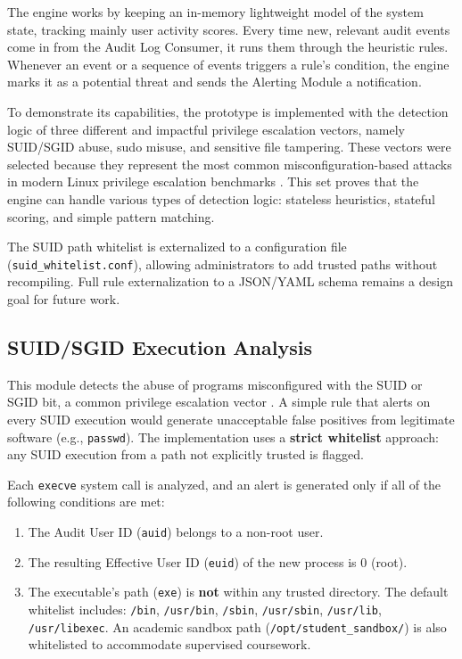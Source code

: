 \documentclass[journal]{./IEEEtran}
\begin{document}
The engine works by keeping an in-memory lightweight model of the system state, tracking mainly user activity scores. Every time new, relevant audit events come in from the Audit Log Consumer, it runs them through the heuristic rules. Whenever an event or a sequence of events triggers a rule's condition, the engine marks it as a potential threat and sends the Alerting Module a notification.

To demonstrate its capabilities, the prototype is implemented with the detection logic of three different and impactful privilege escalation vectors, namely SUID/SGID abuse, sudo misuse, and sensitive file tampering. These vectors were selected because they represent the most common misconfiguration-based attacks in modern Linux privilege escalation benchmarks \cite{happe2024}. This set proves that the engine can handle various types of detection logic: stateless heuristics, stateful scoring, and simple pattern matching.

The SUID path whitelist is externalized to a configuration file (\texttt{suid\_whitelist.conf}), allowing administrators to add trusted paths without recompiling. Full rule externalization to a JSON/YAML schema remains a design goal for future work.

\subsection{SUID/SGID Execution Analysis}
This module detects the abuse of programs misconfigured with the SUID or SGID bit, a common privilege escalation vector \cite{happe2024}. A simple rule that alerts on every SUID execution would generate unacceptable false positives from legitimate software (e.g., \texttt{passwd}). The implementation uses a \textbf{strict whitelist} approach: any SUID execution from a path not explicitly trusted is flagged.

Each \texttt{execve} system call is analyzed, and an alert is generated only if all of the following conditions are met:

\begin{enumerate}
    \item The Audit User ID (\texttt{auid}) belongs to a non-root user.
    \item The resulting Effective User ID (\texttt{euid}) of the new process is 0 (root).
    \item The executable's path (\texttt{exe}) is \textbf{not} within any trusted directory. The default whitelist includes: \texttt{/bin}, \texttt{/usr/bin}, \texttt{/sbin}, \texttt{/usr/sbin}, \texttt{/usr/lib}, \texttt{/usr/libexec}. An academic sandbox path (\texttt{/opt/student\_sandbox/}) is also whitelisted to accommodate supervised coursework.
\end{enumerate}
\end{document}

